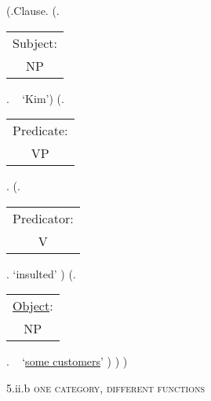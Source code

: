 \documentclass[12pt,letterpaper]{article}
\begin{document}
	\begin{figure}
	\begin{center}
		\begin{parsetree}
			(.Clause.
			(.\begin{tabular}{c}Subject:\\NP\end{tabular}.  ~ `Kim')
			(.\begin{tabular}{c}Predicate:\\VP\end{tabular}.
			(.\begin{tabular}{c}Predicator:\\V\end{tabular}. `insulted' )
			(.\begin{tabular}{c}\underline{Object}:\\NP\end{tabular}. ~ `\underline{some customers}' )
			)
			)
			
			\hfill \break\hfill \break
		\end{parsetree}
		5.ii.b \textsc{one category, different functions}
	\end{center}
\end{figure}
\end{document}
